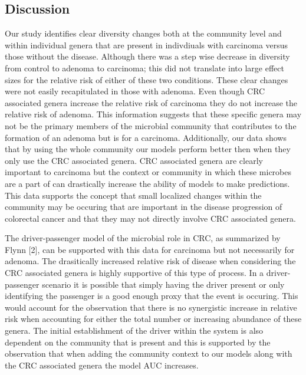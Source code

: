 \documentclass[12pt,]{article}
\begin{document}
\newpage

\subsection{Discussion}\label{discussion}

Our study identifies clear diversity changes both at the community level
and within individual genera that are present in indivdiuals with
carcinoma versus those without the disease. Although there was a step
wise decrease in diversity from control to adenoma to carcinoma; this
did not translate into large effect sizes for the relative risk of
either of these two conditions. These clear changes were not easily
recapitulated in those with adenoma. Even though CRC associated genera
increase the relative risk of carcinoma they do not increase the
relative risk of adenoma. This information suggests that these specific
genera may not be the primary members of the microbial community that
contributes to the formation of an adenoma but is for a carcinoma.
Additionally, our data shows that by using the whole community our
models perform better then when they only use the CRC associated genera.
CRC associated genera are clearly important to carcinoma but the context
or community in which these microbes are a part of can drastically
increase the ability of models to make predictions. This data supports
the concept that small localized changes within the community may be
occuring that are important in the disease progression of colorectal
cancer and that they may not directly involve CRC associated genera.

The driver-passenger model of the microbial role in CRC, as summarized
by Flynn {[}2{]}, can be supported with this data for carcinoma but not
necessarily for adenoma. The drasitically increased relative risk of
disease when considering the CRC associated genera is highly supportive
of this type of process. In a driver-passenger scenario it is possible
that simply having the driver present or only identifying the passenger
is a good enough proxy that the event is occuring. This would account
for the observation that there is no synergistic increase in relative
risk when accounting for either the total number or increasing abundance
of these genera. The initial establishment of the driver within the
system is also dependent on the community that is present and this is
supported by the observation that when adding the community context to
our models along with the CRC associated genera the model AUC increases.
\end{document}
